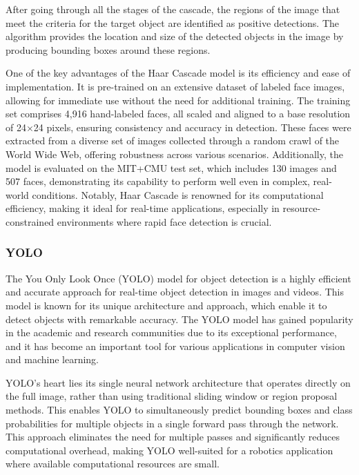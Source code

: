 After going through all the stages of the cascade, the regions of the image that meet the criteria for the target object are identified as positive detections. The algorithm provides the location and size of the detected objects in the image by producing bounding boxes around these regions.

One of the key advantages of the Haar Cascade model is its efficiency and ease of implementation. It is pre-trained on an extensive dataset of labeled face images, allowing for immediate use without the need for additional training. The training set comprises 4,916 hand-labeled faces, all scaled and aligned to a base resolution of 24\(\times\)24 pixels, ensuring consistency and accuracy in detection. These faces were extracted from a diverse set of images collected through a random crawl of the World Wide Web, offering robustness across various scenarios. Additionally, the model is evaluated on the MIT+CMU test set, which includes 130 images and 507 faces, demonstrating its capability to perform well even in complex, real-world conditions. Notably, Haar Cascade is renowned for its computational efficiency, making it ideal for real-time applications, especially in resource-constrained environments where rapid face detection is crucial.

\subsubsection{YOLO}

The You Only Look Once (YOLO) model for object detection is a highly efficient and accurate approach for real-time object detection in images and videos. This model is known for its unique architecture and approach, which enable it to detect objects with remarkable accuracy. The YOLO model has gained popularity in the academic and research communities due to its exceptional performance, and it has become an important tool for various applications in computer vision and machine learning.

YOLO's heart lies its single neural network architecture that operates directly on the full image, rather than using traditional sliding window or region proposal methods. This enables YOLO to simultaneously predict bounding boxes and class probabilities for multiple objects in a single forward pass through the network. This approach eliminates the need for multiple passes and significantly reduces computational overhead, making YOLO well-suited for a robotics application where available computational resources are small.


